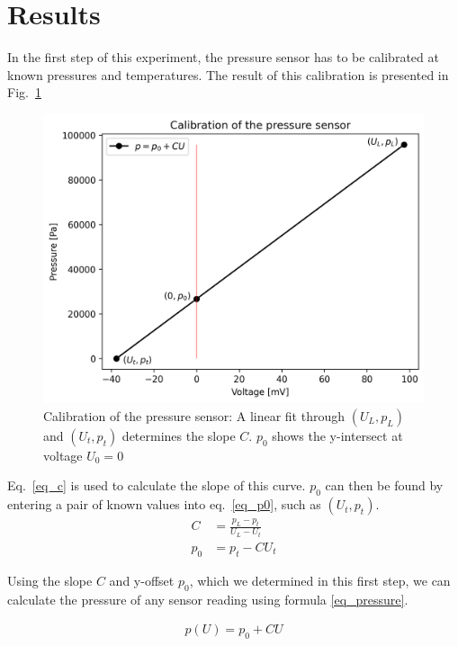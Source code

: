 \section{Results}\label{sec_results}

    In the first step of this experiment, the pressure sensor has to be calibrated at known pressures and temperatures.
    The result of this calibration is presented in Fig.~\ref{fig_calibration}

    \begin{figure}[H]
        \centering
        \includegraphics[]{src/images/calibration.png}
        \caption{Calibration of the pressure sensor: A linear fit through $(U_L,p_L)$ and $(U_t,p_t)$ determines the slope $C$. $p_0$ shows the y-intersect at voltage $U_0 = 0$}
        \label{fig_calibration}
    \end{figure}

    Eq.~\ref{eq_c} is used to calculate the slope of this curve. $p_0$ can then be found by entering a pair of known values into eq.~\ref{eq_p0}, such as $(U_t,p_t)$.
    \begin{align}
        C &= \frac{p_L - p_t}{U_L - U_t} \label{eq_c}\\
        p_0 &= p_t - C U_t \label{eq_p0}
    \end{align}

    Using the slope $C$ and y-offset $p_0$, which we determined in this first step, we can calculate the pressure
    of any sensor reading using formula \ref{eq_pressure}.

    \begin{align}
        p(U) = p_0 + CU \label{eq_pressure}
    \end{align}

